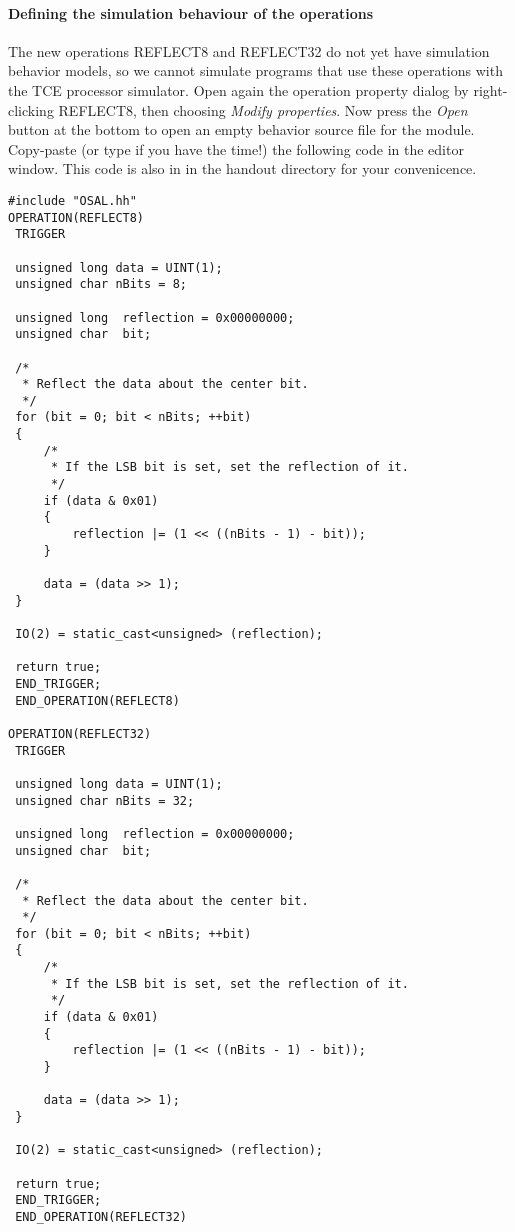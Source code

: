 \documentclass[twoside]{tceusermanual}
\begin{document}
\paragraph{Defining the simulation behaviour of the operations} The new operations
REFLECT8 and REFLECT32 do not yet have simulation behavior models, so
we cannot simulate programs that use these operations with the TCE
processor simulator. Open again the operation property dialog by
right-clicking REFLECT8, then choosing \emph{Modify properties}. Now
press the \emph{Open} button at the bottom to open an empty behavior
source file for the module. Copy-paste (or type if you have the time!) 
the following code in the editor window. This code is also in 
in the handout directory for your convenicence.

\begin{verbatim}
#include "OSAL.hh"
OPERATION(REFLECT8)
 TRIGGER

 unsigned long data = UINT(1);
 unsigned char nBits = 8;

 unsigned long  reflection = 0x00000000;
 unsigned char  bit;

 /*
  * Reflect the data about the center bit.
  */
 for (bit = 0; bit < nBits; ++bit)
 {
     /*
      * If the LSB bit is set, set the reflection of it.
      */
     if (data & 0x01)
     {
         reflection |= (1 << ((nBits - 1) - bit));
     }

     data = (data >> 1);
 }

 IO(2) = static_cast<unsigned> (reflection);

 return true;
 END_TRIGGER;
 END_OPERATION(REFLECT8)

OPERATION(REFLECT32)
 TRIGGER

 unsigned long data = UINT(1);
 unsigned char nBits = 32;

 unsigned long  reflection = 0x00000000;
 unsigned char  bit;

 /*
  * Reflect the data about the center bit.
  */
 for (bit = 0; bit < nBits; ++bit)
 {
     /*
      * If the LSB bit is set, set the reflection of it.
      */
     if (data & 0x01)
     {
         reflection |= (1 << ((nBits - 1) - bit));
     }

     data = (data >> 1);
 }

 IO(2) = static_cast<unsigned> (reflection);

 return true;
 END_TRIGGER;
 END_OPERATION(REFLECT32)
\end{verbatim}
\end{document}
